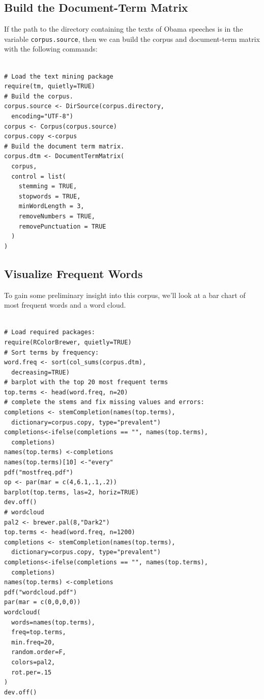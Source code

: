 \documentclass[%
	final,
	notitlepage,
	narroweqnarray,
	inline,
	]{ieee}
\begin{document}
\subsection{Build the Document-Term Matrix}

\PARstart If the path to the directory containing the texts of Obama speeches is in
the variable {\tt corpus.source}, then we can build the corpus and document-term matrix
with the following commands:

\begin{verbatim}

# Load the text mining package
require(tm, quietly=TRUE)
# Build the corpus.
corpus.source <- DirSource(corpus.directory, 
  encoding="UTF-8")
corpus <- Corpus(corpus.source)
corpus.copy <-corpus
# Build the document term matrix.
corpus.dtm <- DocumentTermMatrix(
  corpus, 
  control = list(
    stemming = TRUE, 
    stopwords = TRUE, 
    minWordLength = 3,
    removeNumbers = TRUE, 
    removePunctuation = TRUE
  )
)
\end{verbatim}

\subsection{Visualize Frequent Words}

\PARstart To gain some preliminary insight into this corpus, we'll 
look at a bar chart of most frequent words and a word cloud.

\begin{verbatim}

# Load required packages:
require(RColorBrewer, quietly=TRUE)
# Sort terms by frequency:
word.freq <- sort(col_sums(corpus.dtm), 
  decreasing=TRUE)
# barplot with the top 20 most frequent terms
top.terms <- head(word.freq, n=20)
# complete the stems and fix missing values and errors:
completions <- stemCompletion(names(top.terms), 
  dictionary=corpus.copy, type="prevalent")
completions<-ifelse(completions == "", names(top.terms), 
  completions)
names(top.terms) <-completions
names(top.terms)[10] <-"every"
pdf("mostfreq.pdf")
op <- par(mar = c(4,6.1,.1,.2))
barplot(top.terms, las=2, horiz=TRUE)
dev.off()
# wordcloud
pal2 <- brewer.pal(8,"Dark2")
top.terms <- head(word.freq, n=1200)
completions <- stemCompletion(names(top.terms), 
  dictionary=corpus.copy, type="prevalent")
completions<-ifelse(completions == "", names(top.terms), 
  completions)
names(top.terms) <-completions
pdf("wordcloud.pdf")
par(mar = c(0,0,0,0))
wordcloud(
  words=names(top.terms), 
  freq=top.terms, 
  min.freq=20, 
  random.order=F, 
  colors=pal2, 
  rot.per=.15
)
dev.off()
\end{verbatim}
\end{document}
